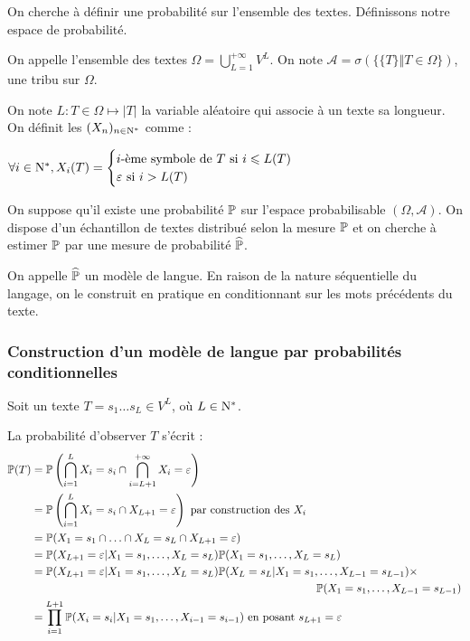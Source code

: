 On cherche à définir une probabilité sur l'ensemble des textes. Définissons notre espace de probabilité.

\begin{definition}
On appelle l'ensemble des textes $\Omega = \bigcup_{L=1}^{+\infty} V^L$.
On note $\mathcal{A} = \sigma\left(\{\{T\} \Vert T \in \Omega \} \right)$, une tribu sur $\Omega$.
\end{definition}

On note $L : T \in \Omega \mapsto \vert T \vert$ la variable aléatoire qui associe à un texte sa longueur.
On définit les $(X_n)_{n \in \N^*}$ comme :

$\forall i \in \N^*, X_i(T) = \begin{cases}
  i\text{-ème symbole de } T \text{ si } i \leq L(T) \\
  \varepsilon \text{ si } i > L(T) 
\end{cases}$

\vspace{0.4cm}

On suppose qu'il existe une probabilité $\P$ sur l'espace probabilisable $(\Omega, \mathcal{A})$.
On dispose d'un échantillon de textes distribué selon la mesure $\P$ et on cherche à estimer $\P$ par une mesure de probabilité $\widehat{\P}$.

On appelle $\widehat{\P}$ un modèle de langue. En raison de la nature séquentielle du langage, on le construit en pratique en conditionnant sur les mots précédents du texte.


\subsubsection{Construction d'un modèle de langue par probabilités conditionnelles}
Soit un texte $T=s_1\ldots s_L \in V^L$, où $L \in\N^*$. 

La probabilité d'observer $T$ s'écrit :
\begin{align*}
  \P(T) &= \P\left(\bigcap_{i=1}^L X_i=s_i \cap \bigcap_{i=L+1}^{+\infty} X_i = \varepsilon\right) \\
  &= \P\left(\bigcap_{i=1}^L X_i=s_i \cap X_{L+1} = \varepsilon  \right) \text{ par construction des } X_i\\
  &= \P(X_1 = s_1 \cap \ldots \cap X_L = s_L \cap X_{L+1} = \varepsilon) \\
  &= \P(X_{L+1}=\varepsilon \vert X_1=s_1,\ldots, X_L=s_L)\P(X_1=s_1,\ldots, X_L=s_L) \\
  &= \P(X_{L+1}=\varepsilon \vert X_1=s_1,\ldots, X_L=s_L)\P(X_L=s_L\vert X_1=s_1,\ldots, X_{L-1}=s_{L-1}) \times \\
  & \hspace{9cm}\P(X_1=s_1 ,\ldots, X_{L-1}=s_{L-1}) \\ 
  &=\prod_{i=1}^{L+1} \P(X_i=s_i \vert X_1=s_1,\ldots, X_{i-1}=s_{i-1}) \text{ en posant } s_{L+1} = \varepsilon
\end{align*}


